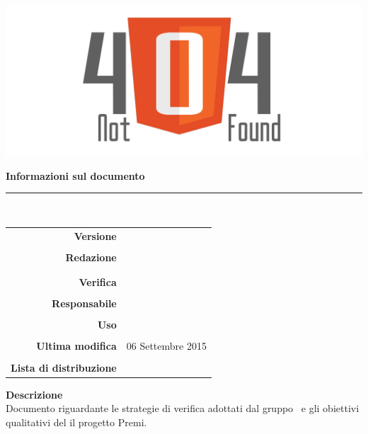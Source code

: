 \thispagestyle{empty}

\begin{titlepage}
	\begin{center}
	\begin{Huge}
		\textbf{\gruppo} \\
	\end{Huge}
	\vspace{0.5cm}
	\begin{Large}
		\textbf{\capitolato}
	\end{Large}
	
	\vspace{1cm}
    
	\includegraphics[scale=0.35]{../logo/logo404_Extends.png}
	\vspace{1cm}
	\begin{Huge}
		\textbf{\titDoc}
	\end{Huge}
	
	\vspace{1cm}
	\textbf{Informazioni sul documento}\\
    \rule{10cm}{.4pt} \\
	\begin{table}[h]
	\begin{center}
	\begin{tabular}{r | l}
		\textbf{Versione} & \versione \\ \\
		\textbf{Redazione} & \GoIs\\
			& \VeFe \\ \\
		\textbf{Verifica} &\ReAn \\ \\
		\textbf{Responsabile} & \CaMa\\ \\
		\textbf{Uso} & \uso \\ \\
		\textbf{Ultima modifica} & 06 Settembre 2015 \\ \\
		\textbf{Lista di distribuzione} & \gruppo \\ 
	\end{tabular}
	\end{center}
	\end{table}
			\textbf{Descrizione} \\
            Documento riguardante le strategie di verifica adottati dal gruppo \gruppo\ e gli obiettivi qualitativi
            del il progetto Premi.
	\end{center}
\end{titlepage}